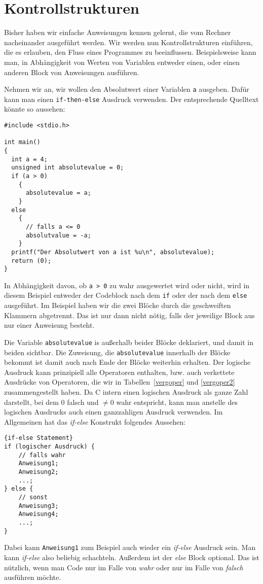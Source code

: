 \section{Kontrollstrukturen}

Bisher haben wir einfache Anweisungen kennen gelernt, die vom Rechner nacheinander ausgeführt werden.
Wir werden nun Kontrollstrukturen einführen, die es erlauben, den Fluss eines Programmes zu beeinflussen.
Beispielsweise kann man, in Abhängigkeit von Werten von Variablen entweder einen, oder einen anderen Block von Anweisungen ausführen.

Nehmen wir an, wir wollen den Absolutwert einer Variablen \verb|a| ausgeben.
Dafür kann man einen \verb|if-then-else| Ausdruck verwenden.
Der entsprechende Quelltext könnte so aussehen:
\begin{lstlisting}
#include <stdio.h>

int main()
{
  int a = 4;
  unsigned int absolutevalue = 0;
  if (a > 0)
    {
      absolutevalue = a;
    }
  else
    {
      // falls a <= 0
      absolutvalue = -a;
    }
  printf("Der Absolutwert von a ist %u\n", absolutevalue);
  return (0);
}
\end{lstlisting}
In Abhängigkeit davon, ob \verb|a > 0| zu wahr ausgewertet wird oder nicht, wird in diesem Beispiel entweder der Codeblock nach dem \verb|if| oder der nach dem \verb|else| ausgeführt.
Im Beispiel haben wir die zwei Blöcke durch die geschweiften Klammern abgetrennt. 
Das ist nur dann nicht nötig, falls der jeweilige Block aus nur einer Anweisung besteht.

Die Variable \verb|absolutevalue| is außerhalb beider Blöcke deklariert, und damit in beiden sichtbar.
Die Zuweisung, die \verb|absolutevalue| innerhalb der Blöcke bekommt ist damit auch nach Ende der Blöcke weiterhin erhalten.
Der logische Ausdruck kann prinzipiell alle Operatoren enthalten, bzw. auch verkettete Ausdrücke von Operatoren, die wir in Tabellen~\ref{vergoper} und \ref{vergoper2} zusammengestellt haben.
Da C intern einen logischen Ausdruck als ganze Zahl darstellt, bei dem $0$ falsch und $\neq 0$ wahr entspricht, kann man anstelle des logischen Ausdrucks auch einen ganzzahligen Ausdruck verwenden.
Im Allgemeinen hat das \emph{if-else} Konstrukt folgendes Aussehen:
\begin{lstlisting}{if-else Statement}
if (logischer Ausdruck) {
    // falls wahr
    Anweisung1;
    Anweisung2;
    ...;
} else {
    // sonst
    Anweisung3;
    Anweisung4;
    ...;
}
\end{lstlisting}
Dabei kann \verb|Anweisung1| zum Beispiel auch wieder ein \emph{if-else} Ausdruck sein. 
Man kann \emph{if-else} also beliebig schachteln.
Außerdem ist der \emph{else} Block optional.
Das ist nützlich, wenn man Code nur im Falle von \emph{wahr} oder nur im Falle von \emph{falsch} ausführen möchte.

